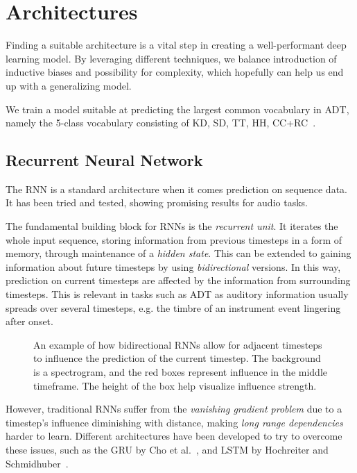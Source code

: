 \chapter{Architectures}\label{Architectures}

Finding a suitable architecture is a vital step in creating a well-performant deep learning model. By leveraging different techniques, we balance introduction of inductive biases and possibility for complexity, which hopefully can help us end up with a generalizing model.

We train a model suitable at predicting the largest common vocabulary in \gls{ADT}, namely the 5-class vocabulary consisting of \acrfull{KD}, \acrfull{SD}, \acrfull{TT}, \acrfull{HH}, \acrfull{CC+RC}~\cite{zehren2024analyzingreducingsynthetictorealtransfer}.

\section{Recurrent Neural Network}

The \gls{RNN} is a standard architecture when it comes prediction on sequence data. It has been tried and tested, showing promising results for audio tasks.

The fundamental building block for \glspl{RNN} is the \textit{recurrent unit}. It iterates the whole input sequence, storing information from previous timesteps in a form of memory, through maintenance of a \textit{hidden state}. This can be extended to gaining information about future timesteps by using \textit{bidirectional} versions. In this way, prediction on current timesteps are affected by the information from surrounding timesteps. This is relevant in tasks such as \gls{ADT} as auditory information usually spreads over several timesteps, e.g. the timbre of an instrument event lingering after onset.

\begin{figure}[H]
    \centering
    
    \caption{An example of how bidirectional \glspl{RNN} allow for adjacent timesteps to influence the prediction of the current timestep. The background is a spectrogram, and the red boxes represent influence in the middle timeframe. The height of the box help visualize influence strength.}
    \label{RNNInfluenceFigure}
\end{figure}

However, traditional \glspl{RNN} suffer from the \textit{vanishing gradient problem} due to a timestep's influence diminishing with distance, making \textit{long range dependencies} harder to learn. Different architectures have been developed to try to overcome these issues, such as the \gls{GRU} by Cho et al.~\cite{DBLP:conf/emnlp/ChoMGBBSB14}, and \gls{LSTM} by Hochreiter and Schmidhuber~\cite{10.1162/neco.1997.9.8.1735}.

